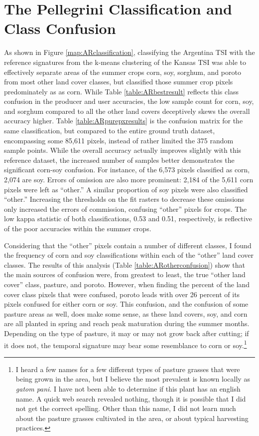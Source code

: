 \section{The Pellegrini Classification and Class Confusion}

As shown in Figure \ref{map:ARclassification}, classifying the Argentina TSI with the reference signatures from the k-means clustering of the Kansas TSI was able to effectively separate areas of the summer crops corn, soy, sorghum, and poroto from most other land cover classes, but classified those summer crop pixels predominately as as corn. While Table \ref{table:ARbestresult} reflects this class confusion in the producer and user accuracies, the low sample count for corn, soy, and sorghum compared to all the other land covers deceptively skews the overall accuracy higher. Table \ref{table:ARpurepxresults} is the confusion matrix for the same classification, but compared to the entire ground truth dataset, encompassing some 85,611 pixels, instead of rather limited the 375 random sample points. While the overall accuracy actually improves slightly with this reference dataset, the increased number of samples better demonstrates the significant corn-soy confusion. For instance, of the 6,573 pixels classified as corn, 2,074 are soy. Errors of omission are also more prominent: 2,184 of the 5,611 corn pixels were left as ``other.'' A similar proportion of soy pixels were also classified ``other.'' Increasing the thresholds on the fit rasters to decrease these omissions only increased the errors of commission, confusing ``other'' pixels for crops. The low kappa statistic of both classifications, 0.53 and 0.51, respectively, is reflective of the poor accuracies within the summer crops.

Considering that the ``other'' pixels contain a number of different classes, I found the frequency of corn and soy classifications within each of the ``other'' land cover classes. The results of this analysis (Table \ref{table:ARotherconfusion}) show that the main sources of confusion were, from greatest to least, the true ``other land cover'' class, pasture, and poroto. However, when finding the percent of the land cover class pixels that were confused, poroto leads with over 26 percent of its pixels confused for either corn or soy. This confusion, and the confusion of some pasture areas as well, does make some sense, as these land covers, soy, and corn are all planted in spring and reach peak maturation during the summer months. Depending on the type of pasture, it may or may not grow back after cutting; if it does not, the temporal signature may bear some resemblance to corn or soy.\footnote{I heard a few names for a few different types of pasture grasses that were being grown in the area, but I believe the most prevalent is known locally as \textit{\textspanish{gatom pani}}. I have not been able to determine if this plant has an english name. A quick web search revealed nothing, though it is possible that I did not get the correct spelling. Other than this name, I did not learn much about the pasture grasses cultivated in the area, or about typical harvesting practices.}

